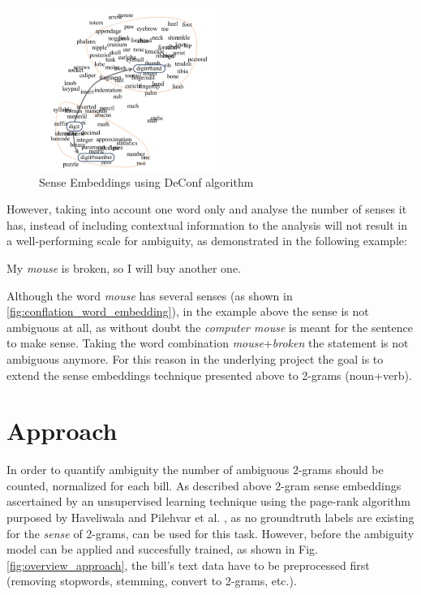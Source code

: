\documentclass[a4paper, 12pt]{article}
\begin{document}
\begin{figure}[H]
\begin{center}
\includegraphics[width=6cm]{imgs/page_rank_embedding}
\end{center}
\caption{Sense Embeddings using DeConf algorithm \cite{knowledge_based_page_rank}}
\label{fig:page_rank_embedding}
\end{figure}

However, taking into account one word only and analyse the number of senses it has, instead of including contextual information to the analysis will not result in a well-performing scale for ambiguity, as demonstrated in the following example:

\begin{center}
My \emph{mouse} is broken, so I will buy another one.
\end{center}

Although the word \textit{mouse} has several senses (as shown in \ref{fig:conflation_word_embedding}), in the example above the sense is not ambiguous at all, as without doubt the \textit{computer mouse} is meant for the sentence to make sense. Taking the word combination \textit{mouse}+\textit{broken} the statement is not ambiguous anymore. For this reason in the underlying project the goal is to extend the sense embeddings technique presented above to 2-grams (noun+verb).

\section*{Approach}
In order to quantify ambiguity the number of ambiguous 2-grams should be counted, normalized for each bill. As described above 2-gram sense embeddings ascertained by an unsupervised learning technique using the page-rank algorithm purposed by Haveliwala \cite{topic_sensitive_page_rank} and Pilehvar et al. \cite{senses_to_texts}, as no groundtruth labels are existing for the \textit{sense} of 2-grams, can be used for this task. However, before the ambiguity model can be applied and succesfully trained, as shown in Fig. \ref{fig:overview_approach}, the bill's text data have to be preprocessed first (removing stopwords, stemming, convert to 2-grams, etc.).
\end{document}
